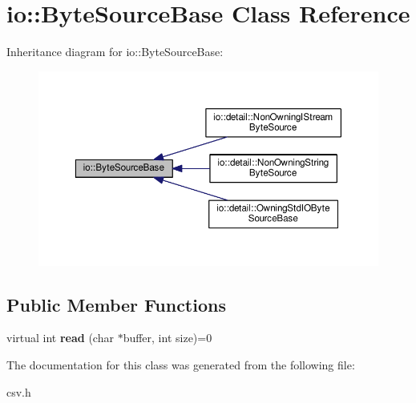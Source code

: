 \section{io\+:\+:Byte\+Source\+Base Class Reference}
\label{classio_1_1_byte_source_base}


Inheritance diagram for io\+:\+:Byte\+Source\+Base\+:\nopagebreak
\begin{figure}[H]
\begin{center}
\leavevmode
\includegraphics[width=350pt]{classio_1_1_byte_source_base__inherit__graph}
\end{center}
\end{figure}
\subsection*{Public Member Functions}
\begin{DoxyCompactItemize}
\item 
virtual int {\bfseries read} (char $\ast$buffer, int size)=0\label{classio_1_1_byte_source_base_a9598bcc869b79e44da07f0e6fa478615}

\end{DoxyCompactItemize}


The documentation for this class was generated from the following file\+:\begin{DoxyCompactItemize}
\item 
csv.\+h\end{DoxyCompactItemize}
